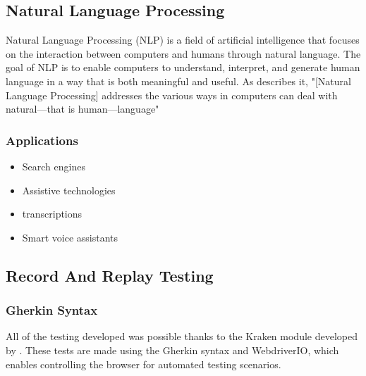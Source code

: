 \subsection{Natural Language Processing}

Natural Language Processing (NLP) is a field of artificial intelligence that focuses on the interaction between computers and humans through natural language. The goal of NLP is to enable computers to understand, interpret, and generate human language in a way that is both meaningful and useful. As \cite{book:nlp-2022} describes it, "[Natural Language Processing] addresses the various ways in computers can deal with natural—that is human—language"


\subsubsection{Applications}

\begin{itemize}
    \item Search engines
    \item Assistive technologies
    \item transcriptions
    \item Smart voice assistants
\end{itemize}


\subsection{Record And Replay Testing}


\subsubsection{Gherkin Syntax}

All of the testing developed was possible thanks to the Kraken module developed by \cite{art:kraken-2023}. These tests are made using the Gherkin syntax and WebdriverIO, which enables controlling the browser for automated testing scenarios.



